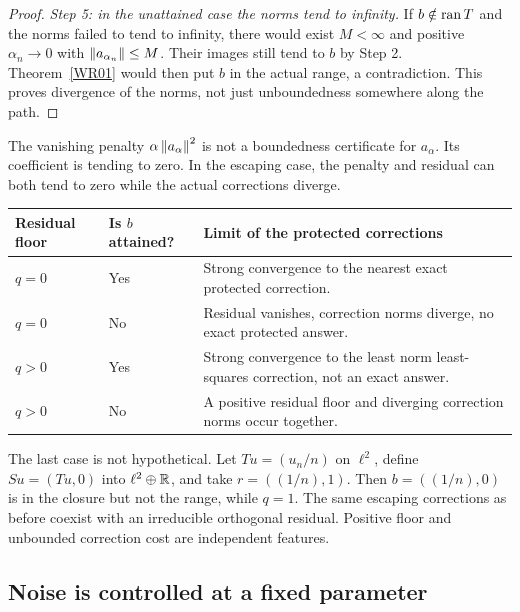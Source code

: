 \begin{proof}
\emph{Step 5: in the unattained case the norms tend to infinity.} If $b\notin\operatorname{ran} T$ and the norms failed to tend to infinity, there would exist $M<\infty$ and positive $\alpha_n\to0$ with $\left\lVert a_{\alpha_n}\right\rVert\le M$. Their images still tend to $b$ by Step 2. Theorem~\ref{WR01} would then put $b$ in the actual range, a contradiction. This proves divergence of the norms, not just unboundedness somewhere along the path.
\end{proof}

The vanishing penalty $\alpha\left\lVert a_\alpha\right\rVert^2$ is not a boundedness certificate for $a_\alpha$. Its coefficient is tending to zero. In the escaping case, the penalty and residual can both tend to zero while the actual corrections diverge.

\begin{center}
\begin{tabularx}{\linewidth}{@{}p{.17\linewidth}p{.26\linewidth}X@{}}
\toprule Residual floor & Is $b$ attained? & Limit of the protected corrections\\\midrule
$q=0$ & Yes & Strong convergence to the nearest exact protected correction.\\[3pt]
$q=0$ & No & Residual vanishes, correction norms diverge, no exact protected answer.\\[3pt]
$q>0$ & Yes & Strong convergence to the least norm least-squares correction, not an exact answer.\\[3pt]
$q>0$ & No & A positive residual floor and diverging correction norms occur together.\\\bottomrule
\end{tabularx}
\end{center}

The last case is not hypothetical. Let $Tu=(u_n/n)$ on $\ell^2$, define $Su=(Tu,0)$ into $\ell^2\oplus\mathbb R$, and take $r=((1/n),1)$. Then $b=((1/n),0)$ is in the closure but not the range, while $q=1$. The same escaping corrections as before coexist with an irreducible orthogonal residual. Positive floor and unbounded correction cost are independent features.

\subsection{Noise is controlled at a fixed parameter}


